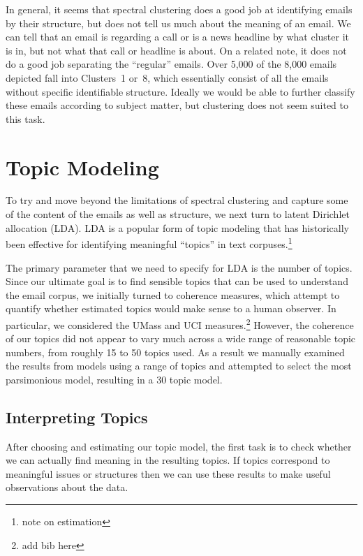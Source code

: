 \documentclass[12pt]{article}
\theoremstyle{definition}
\theoremstyle{algodesc}
\begin{document}
In general, it seems that spectral clustering does a good job at identifying emails by their structure, but does not tell us much about the meaning of an email. We can tell that an email is regarding a call or is a news headline by what cluster it is in, but not what that call or headline is about. On a related note, it does not do a good job separating the ``regular'' emails. Over 5,000 of the 8,000 emails depicted fall into Clusters~1 or~8, which essentially consist of all the emails without specific identifiable structure. Ideally we would be able to further classify these emails according to subject matter, but clustering does not seem suited to this task.


\section{Topic Modeling}
To try and move beyond the limitations of spectral clustering and capture some of the content of the emails as well as structure, we next turn to latent Dirichlet allocation (LDA). LDA is a popular form of topic modeling that has historically been effective for identifying meaningful ``topics'' in text corpuses.\footnote{note on estimation}

The primary parameter that we need to specify for LDA is the number of topics. Since our ultimate goal is to find sensible topics that can be used to understand the email corpus, we initially turned to coherence measures, which attempt to quantify whether estimated topics would make sense to a human observer. In particular, we considered the UMass and UCI measures.\footnote{add bib here} However, the coherence of our topics did not appear to vary much across a wide range of reasonable topic numbers, from roughly 15 to 50 topics used. As a result we manually examined the results from models using a range of topics and attempted to select the most parsimonious model, resulting in a 30 topic model.



\subsection{Interpreting Topics}
After choosing and estimating our topic model, the first task is to check whether we can actually find meaning in the resulting topics. If topics correspond to meaningful issues or structures then we can use these results to make useful observations about the data.
\end{document}
